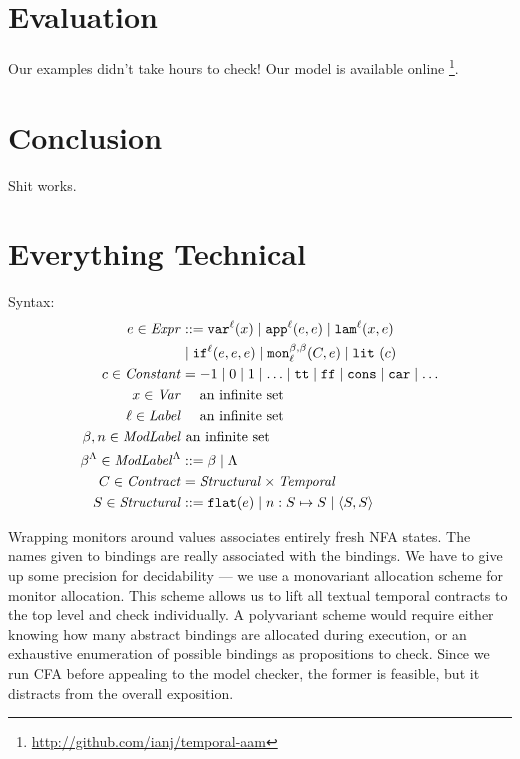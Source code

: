 \documentclass[preprint,onecolumn,9pt]{sigplanconf} %
\begin{document}
\section{Evaluation}

Our examples didn't take hours to check!
%
Our model is available online \footnote{\url{http://github.com/ianj/temporal-aam}}.

\section{Conclusion}

Shit works.

\section{Everything Technical}\label{sec:technical}

Syntax:
\begin{align*}
\mexp \in \Expr &::=
      \svar[^\mlab]{\mvar}
 \alt \sapp[^\mlab]{\mexp}{\mexp}
 \alt \slam[^\mlab]{\mvar}{\mexp} \\
&\alt \sif[^\mlab]{\mexp}{\mexp}{\mexp} 
 \alt \sMon{\mmlab}{\mmlab}{\mlab}{\mcontract, \mexp}
 \alt \slit{\mconstant} \\
\mconstant \in \Constant &= -1 \alt 0 \alt 1 \alt \ldots \alt \strue \alt \sfalse \alt \scons \alt \scar \alt \ldots \\
\mvar \in \Var &\quad\text{ an infinite set} \\
\mlab \in \Label &\quad\text{ an infinite set} \\
\mmlab,\mname \in \ModuleLabel &\text{ an infinite set} \\
\msmlab \in \ModuleLabel^{\toplevel} &::= \mmlab \alt \toplevel \\
\mcontract \in \Contract &= \SContract \times \TContract \\
\mscon \in \SContract &::= \sflat{\mexp} \alt \sarr{\mname}{\mscon}{\mscon} \alt \sconsc{\mscon}{\mscon} \\
\end{align*}

Wrapping monitors around values associates entirely fresh NFA states.
%
The names given to bindings are really associated with the bindings.
%
We have to give up some precision for decidability --- we use a monovariant allocation scheme for monitor allocation.
%
This scheme allows us to lift all textual temporal contracts to the top level and check individually.
%
A polyvariant scheme would require either knowing how many abstract bindings are allocated during execution, or an exhaustive enumeration of possible bindings as propositions to check.
%
Since we run CFA before appealing to the model checker, the former is feasible, but it distracts from the overall exposition.
\end{document}
